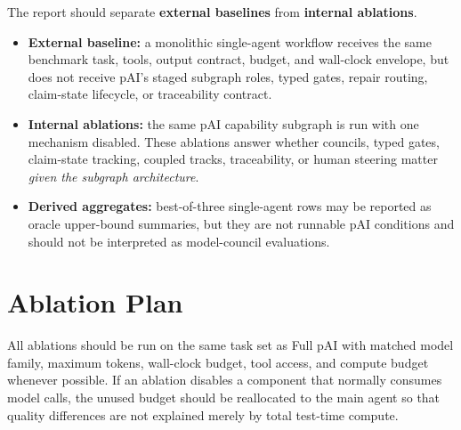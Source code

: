 \documentclass[11pt]{article}
\newcommand{\pai}{pAI}
\begin{document}
The report should separate \textbf{external baselines} from \textbf{internal ablations}.

\begin{itemize}
  \item \textbf{External baseline:} a monolithic single-agent workflow receives the same benchmark task, tools, output contract, budget, and wall-clock envelope, but does not receive \pai{}'s staged subgraph roles, typed gates, repair routing, claim-state lifecycle, or traceability contract.
  \item \textbf{Internal ablations:} the same \pai{} capability subgraph is run with one mechanism disabled. These ablations answer whether councils, typed gates, claim-state tracking, coupled tracks, traceability, or human steering matter \emph{given the subgraph architecture}.
  \item \textbf{Derived aggregates:} best-of-three single-agent rows may be reported as oracle upper-bound summaries, but they are not runnable \pai{} conditions and should not be interpreted as model-council evaluations.
\end{itemize}

\section*{Ablation Plan}

All ablations should be run on the same task set as Full \pai{} with matched model family, maximum tokens, wall-clock budget, tool access, and compute budget whenever possible. If an ablation disables a component that normally consumes model calls, the unused budget should be reallocated to the main agent so that quality differences are not explained merely by total test-time compute.
\end{document}
